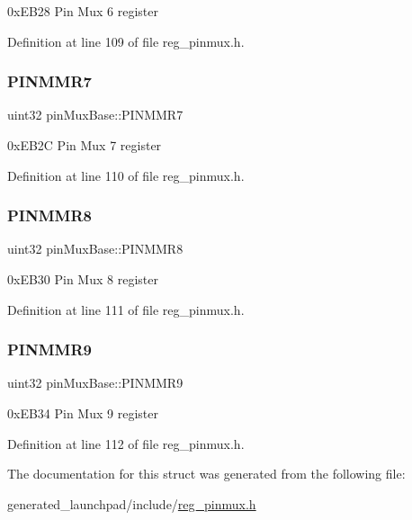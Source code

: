0x\+E\+B28 Pin Mux 6 register 

Definition at line 109 of file reg\+\_\+pinmux.\+h.

\mbox{\label{structpinMuxBase_ac99df9383a0798ca780da5ef63137bed}} 
\subsubsection{\texorpdfstring{P\+I\+N\+M\+M\+R7}{PINMMR7}}
{\footnotesize\ttfamily uint32 pin\+Mux\+Base\+::\+P\+I\+N\+M\+M\+R7}

0x\+E\+B2C Pin Mux 7 register 

Definition at line 110 of file reg\+\_\+pinmux.\+h.

\mbox{\label{structpinMuxBase_a0e23d2591f33897f2c60247cdb7a3e77}} 
\subsubsection{\texorpdfstring{P\+I\+N\+M\+M\+R8}{PINMMR8}}
{\footnotesize\ttfamily uint32 pin\+Mux\+Base\+::\+P\+I\+N\+M\+M\+R8}

0x\+E\+B30 Pin Mux 8 register 

Definition at line 111 of file reg\+\_\+pinmux.\+h.

\mbox{\label{structpinMuxBase_a74b13c419d66022d6de6216a6444be1e}} 
\subsubsection{\texorpdfstring{P\+I\+N\+M\+M\+R9}{PINMMR9}}
{\footnotesize\ttfamily uint32 pin\+Mux\+Base\+::\+P\+I\+N\+M\+M\+R9}

0x\+E\+B34 Pin Mux 9 register 

Definition at line 112 of file reg\+\_\+pinmux.\+h.



The documentation for this struct was generated from the following file\+:\begin{DoxyCompactItemize}
\item 
generated\+\_\+launchpad/include/\mbox{\hyperlink{reg__pinmux_8h}{reg\+\_\+pinmux.\+h}}\end{DoxyCompactItemize}
